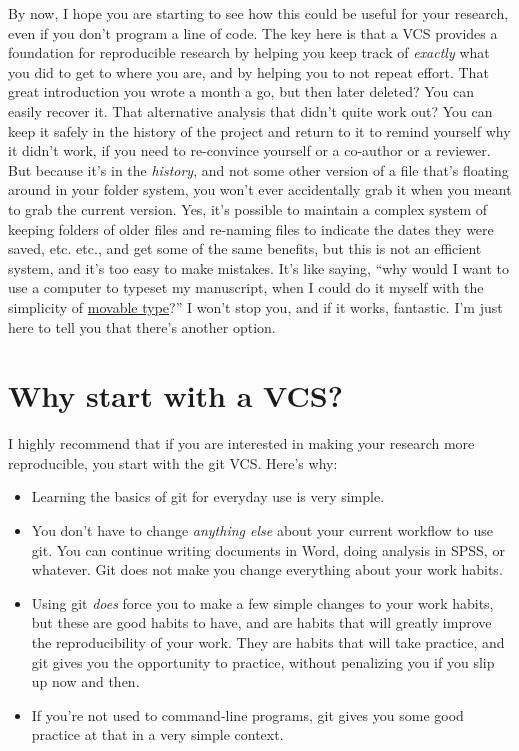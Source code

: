 \documentclass[11pt]{article}
\begin{document}
By now, I hope you are starting to see how this could be useful for your research, even if you don't program a line of code. The key here is that a VCS provides a foundation for reproducible research by helping you keep track of \emph{exactly} what you did to get to where you are, and by helping you to not repeat effort. That great introduction you wrote a month a go, but then later deleted?  You can easily recover it.  That alternative analysis that didn't quite work out?  You can keep it safely in the history of the project and return to it to remind yourself why it didn't work, if you need to re-convince yourself or a co-author or a reviewer. But because it's in the \emph{history}, and not some other version of a file that's floating around in your folder system, you won't ever accidentally grab it when you meant to grab the current version. Yes, it's possible to maintain a complex system of keeping folders of older files and re-naming files to indicate the dates they were saved, etc. etc., and get some of the same benefits, but this is not an efficient system, and it's too easy to make mistakes.  It's like saying, ``why would I want to use a computer to typeset my manuscript, when I could do it myself with the simplicity of \href{http://en.wikipedia.org/wiki/Movable_type}{movable type}?''  I won't stop you, and if it works, fantastic. I'm just here to tell you that there's another option.
\section{Why start with a VCS?}
\label{sec-3}

I highly recommend that if you are interested in making your research more reproducible, you start with the git VCS. Here's why:

\begin{itemize}
\item Learning the basics of git for everyday use is very simple.
\item You don't have to change \emph{anything else} about your current workflow to use git. You can continue writing documents in Word, doing analysis in SPSS, or whatever.  Git does not make you change everything about your work habits.
\item Using git \emph{does} force you to make a few simple changes to your work habits, but these are good habits to have, and are habits that will greatly improve the reproducibility of your work. They are habits that will take practice, and git gives you the opportunity to practice, without penalizing you if you slip up now and then.
\item If you're not used to command-line programs, git gives you some good practice at that in a very simple context.
\end{itemize}
\end{document}
